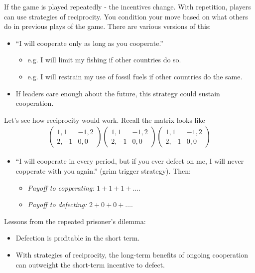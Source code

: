 \documentclass{article}
\newcommand{\mat}[1]{\begin{pmatrix}#1\end{pmatrix}}
\begin{document}
  If the game is played repeatedly - the incentives change.  With repetition, players can use strategies of reciprocity.  You condition your move based on what others do in previous plays of the game.  There are various versions of this:

  \begin{itemize}
    \item ``I will cooperate only as long as you cooperate.''
      \begin{itemize}
        \item e.g. I will limit my fishing if other countries do so.
        \item e.g. I will restrain my use of fossil fuels if other countries do the same.
      \end{itemize}
    \item If leaders care enough about the future, this strategy could sustain cooperation.
  \end{itemize}

  Let's see how reciprocity would work.  Recall the matrix looks like
  \begin{align*}
    \mat{1, 1 & -1, 2 \\ 2, -1 & 0, 0}
    \mat{1, 1 & -1, 2 \\ 2, -1 & 0, 0}
    \mat{1, 1 & -1, 2 \\ 2, -1 & 0, 0}
  \end{align*}

  \begin{itemize}
    \item ``I will cooperate in every period, but if you ever defect on me, I will never copperate with you again.'' (grim trigger strategy).  Then:
      \begin{itemize}
        \item {\it Payoff to copperating: } $1 + 1 + 1 + \dots $.
        \item {\it Payoff to defecting: } $2 + 0 + 0 + \dots $.
      \end{itemize}
  \end{itemize}

  Lessons from the repeated prisoner's dilemma:

  \begin{itemize}
    \item Defection is profitable in the short term.
    \item With strategies of reciprocity, the long-term benefits of ongoing cooperation can outweight the short-term incentive to defect.
  \end{itemize}
\end{document}
